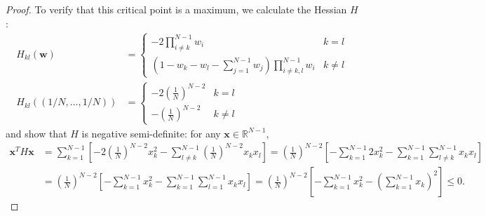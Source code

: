 \documentclass{article}
\begin{document}
\begin{proof}
To verify that this critical point is a maximum, we calculate the Hessian $H$:
\begin{align*}
H_{kl}(\mathbf{w})
&= \begin{cases}
-2 \prod_{i\neq k}^{N-1} w_i & k=l \\
\left( 1 - w_k - w_l - \sum_{j=1}^{N-1} w_j \right)\prod_{i\neq k,l}^{N-1}w_i & k\neq l
\end{cases} \\
H_{kl}((1/N, \dots, 1/N))&= \begin{cases}
-2 \left(\frac{1}{N}\right)^{N-2} & k=l \\
- \left(\frac{1}{N}\right)^{N-2} & k\neq l
\end{cases}
\end{align*}
and show that $H$ is negative semi-definite: for any $\mathbf{x} \in \mathbb{R}^{N-1}$,
\begin{align*}
\mathbf{x}^T H \mathbf{x} &= \sum_{k=1}^{N-1} \left[ -2\left(\frac{1}{N}\right)^{N-2} x_k^2
- \sum_{l\neq k}^{N-1} \left(\frac{1}{N}\right)^{N-2} x_k x_l \right] 
= \left(\frac{1}{N}\right)^{N-2} \left[ -\sum_{k=1}^{N-1} 2x_k^2 - \sum_{k=1}^{N-1} \sum_{l\neq k}^{N-1} x_k x_l \right] \\
&= \left(\frac{1}{N}\right)^{N-2} \left[ -\sum_{k=1}^{N-1} x_k^2 - \sum_{k=1}^{N-1} \sum_{l=1}^{N-1} x_k x_l \right]
= \left(\frac{1}{N}\right)^{N-2} \left[ - \sum_{k=1}^{N-1} x_k^2 - \left(\sum_{k=1}^{N-1} x_k \right)^2 \right]
\leq 0 .
\end{align*}
\end{proof}
\end{document}
